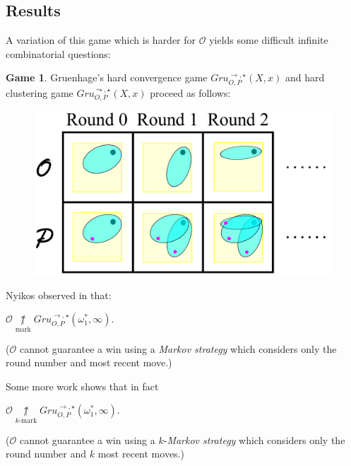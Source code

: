 \documentclass{beamer}
\theoremstyle{definition}
\newtheorem{game}[theorem]{Game}
\newcommand{\notmarkwin}{\underset{\text{mark}}{\not\uparrow}}
\newcommand{\notkmarkwin}[1]{\underset{#1\text{-mark}}{\not\uparrow}}
\newcommand{\oneptcomp}[1]{#1^*}
\newcommand{\gruConGameHard}[2]{Gru_{O,P}^{\to,\star}\left({#1},{#2}\right)}
\newcommand{\gruClusGameHard}[2]{Gru_{O,P}^{\leadsto,\star}\left({#1},{#2}\right)}
\newcommand{\<}{\langle}
\renewcommand{\>}{\rangle}
\newcommand{\pl}[1]{\mathscr{#1}}
\newcommand{\term}{\textit}
\begin{document}
\subsection{Results}

\begin{frame}
  A variation of this game which is harder for $\pl O$ yields some
  difficult infinite combinatorial questions:

  \begin{game}
  Gruenhage's hard convergence game $\gruConGameHard{X}{x}$
  and hard clustering game $\gruClusGameHard{X}{x}$ proceed as follows:
    \begin{figure}
      \includegraphics[width=0.6\linewidth]{convergenceHardGame.pdf}
    \end{figure}
  \end{game}
\end{frame}

\begin{frame}
  Nyikos observed in \cite{MR1031771} that:
  \begin{theorem}
    $\pl O \notmarkwin \gruConGameHard{\oneptcomp\omega_1}{\infty}$.

    {\small ($\pl O$ cannot guarantee a win using a \term{Markov strategy}
    which considers only the round number and most recent move.) }
  \end{theorem}

  \vpause

  Some more work shows that in fact
  \begin{theorem}
    $\pl O \notkmarkwin{k} \gruConGameHard{\oneptcomp\omega_1}{\infty}$.

    {\small ($\pl O$ cannot guarantee a win using a $k$-\term{Markov strategy}
    which considers only the round number and $k$ most recent moves.) }
  \end{theorem}
\end{frame}
\end{document}
